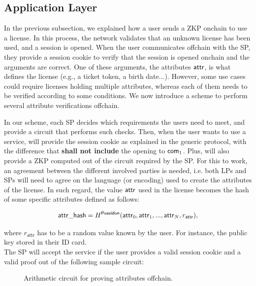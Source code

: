 \subsection{Application Layer}

In the previous subsection, we explained how a user sends a ZKP onchain to use a license. In this process, the network validates that an unknown license has been used, and a session is opened. When the user communicates offchain with the SP, they provide a session cookie to verify that the session is opened onchain and the arguments are correct. One of these arguments, the attributes $\mathsf{attr}$, is what defines the license (e.g., a ticket token, a birth date...). However, some use cases could require licenses holding multiple attributes, whereas each of them needs to be verified according to some conditions. We now introduce a scheme to perform several attribute verifications offchain.

In our scheme, each SP decides which requirements the users need to meet, and provide a circuit that performs such checks. Then, when the user wants to use a service, will provide the session cookie as explained in the generic protocol, with the difference that \textbf{shall not include} the opening to $\mathsf{com}_1$. Plus, will also provide a ZKP computed out of the circuit required by the SP. For this to work, an agreement between the different involved parties is needed, i.e. both LPs and SPs will need to agree on the language (or encoding) used to create the attributes of the license. In such regard, the value $\mathsf{attr}$ used in the license becomes the hash of some specific attributes defined as follows:

$$\mathsf{attr}\_\mathsf{hash} = H^\mathsf{Poseidon}(\mathsf{attr}_0, \mathsf{attr}_1, ..., \mathsf{attr}_N, r_\mathsf{attr}),$$

where $r_\mathsf{attr}$ has to be a random value known by the user. For instance, the public key stored in their ID card.\\

The SP will accept the service if the user provides a valid session cookie and a valid proof out of the following sample circuit:

\begin{figure}[h]
	\centering
	\setlength{\fboxsep}{5pt}%
	\setlength{\fboxrule}{0.3pt}%
	\caption{Arithmetic circuit for proving attributes offchain.}
	\label{fig:circuit_prove_offchain}
\end{figure}
